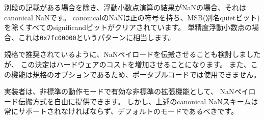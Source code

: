 \begin{comment}
Except when otherwise stated, if the result of a floating-point operation is
NaN, it is the canonical NaN.  The canonical NaN has a positive sign and all
significand bits clear except the MSB, a.k.a. the quiet bit.  For
single-precision floating-point, this corresponds to the pattern {\tt
0x7fc00000}.
\end{comment}

別段の記載がある場合を除き、浮動小数点演算の結果がNaNの場合、それはcanonical NaNです。
canonicalのNaNは正の符号を持ち、MSB(別名quietビット)を除くすべてのsignificandビットがクリアされています。
単精度浮動小数点の場合、これは{\tt 0x7fc00000}というパターンに相当します。

\begin{commentary}
\begin{comment}
We considered propagating NaN payloads, as is recommended by the standard,
but this decision would have increased hardware cost.  Moreover, since this
feature is optional in the standard, it cannot be used in portable code.
\end{comment}

規格で推奨されているように、NaNペイロードを伝搬させることも検討しましたが、
この決定はハードウェアのコストを増加させることになります。 
また、この機能は規格のオプションであるため、ポータブルコードでは使用できません。

\begin{comment}
Implementors are free to provide a NaN payload propagation scheme as
a nonstandard extension enabled by a nonstandard operating mode.  However, the
canonical NaN scheme described above must always be supported and should be
the default mode.
\end{comment}

実装者は、非標準の動作モードで有効な非標準の拡張機能として、
NaNペイロード伝搬方式を自由に提供できます。 
しかし、上述のcanonical NaNスキームは常にサポートされなければならず、デフォルトのモードであるべきです。
\end{commentary}

